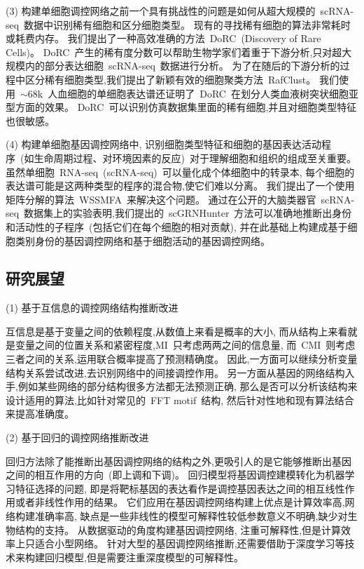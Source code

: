 (3) 构建单细胞调控网络之前一个具有挑战性的问题是如何从超大规模的~scRNA-seq~数据中识别稀有细胞和区分细胞类型。
现有的寻找稀有细胞的算法非常耗时或耗费内存。
我们提出了一种高效准确的方法~DoRC~(Discovery of Rare Cells)。
DoRC~产生的稀有度分数可以帮助生物学家们着重于下游分析,只对超大规模内的部分表达细胞~scRNA-seq~数据进行分析。
为了在随后的下游分析的过程中区分稀有细胞类型,我们提出了新颖有效的细胞聚类方法~RafClust。
我们使用~${\sim}68$k~人血细胞的单细胞表达谱还证明了~DoRC~在划分人类血液树突状细胞亚型方面的效果。
DoRC~可以识别仿真数据集里面的稀有细胞,并且对细胞类型特征也很敏感。

(4) 构建单细胞基因调控网络中, 
识别细胞类型特征和细胞的基因表达活动程序~(如生命周期过程、对环境因素的反应)~对于理解细胞和组织的组成至关重要。
虽然单细胞~RNA-seq~(scRNA-seq)~可以量化成个体细胞中的转录本,
每个细胞的表达谱可能是这两种类型的程序的混合物,使它们难以分离。
我们提出了一个使用矩阵分解的算法~WSSMFA~来解决这个问题。
通过在公开的大脑类器官~scRNA-seq~数据集上的实验表明,我们提出的~scGRNHunter~方法可以准确地推断出身份和活动性的子程序~(包括它们在每个细胞的相对贡献), 
并在此基础上构建成基于细胞类别身份的基因调控网络和基于细胞活动的基因调控网络。

\subsection{研究展望}

(1) 基于互信息的调控网络结构推断改进

互信息是基于变量之间的依赖程度,从数值上来看是概率的大小,
而从结构上来看就是变量之间的位置关系和紧密程度,MI~只考虑两两之间的信息量,
而~CMI~则考虑三者之间的关系,运用联合概率提高了预测精确度。
因此,一方面可以继续分析变量结构关系尝试改进,去识别网络中的间接调控作用。
另一方面从基因的网络结构入手,例如某些网络的部分结构很多方法都无法预测正确,
那么是否可以分析该结构来设计适用的算法,比如针对常见的~FFT motif~结构, 
然后针对性地和现有算法结合来提高准确度。

(2) 基于回归的调控网络推断改进

回归方法除了能推断出基因调控网络的结构之外,更吸引人的是它能够推断出基因之间的相互作用的方向~(即上调和下调)。
回归模型将基因调控建模转化为机器学习特征选择的问题,
即是将靶标基因的表达看作是调控基因表达之间的相互线性作用或者非线性作用的结果。
它们应用在基因调控网络构建上优点是计算效率高,网络构建准确率高,
缺点是一些非线性的模型可解释性较低参数意义不明确,缺少对生物结构的支持。
从数据驱动的角度构建基因调控网络, 注重可解释性,但是计算效率上只适合小型网络。
针对大型的基因调控网络推断,还需要借助于深度学习等技术来构建回归模型,但是需要注重深度模型的可解释性。

